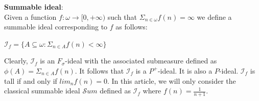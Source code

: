 \documentclass[a4paper]{amsart}
\newcommand{\SUM}{\mathcal{S}um}
\begin{document}
\textbf{Summable ideal}:\\
        Given a function $f:\omega\rightarrow[0,+\infty)$ such that $\Sigma_{n\in\omega}f(n)=\infty$ we define a summable ideal corresponding to $f$ as follows:
        \begin{center}
            $\mathcal{I}_{f}=\{A\subseteq\omega:\Sigma_{n\in A}f(n)<\infty\}$
        \end{center}
        Clearly, $\mathcal{I}_{f}$ is an $F_{\sigma}$-ideal with the associated submeasure defined as $\phi(A)=\Sigma_{n\in A}f(n)$. It follows that $\mathcal{I}_{f}$ is a $P^{+}$-ideal. It is also a $P$-ideal. $\mathcal{I}_{f}$ is tall if and only if $lim_{n}f(n)=0$. In this article, we will only consider the classical summable ideal $\SUM$ defined as $\mathcal{I}_{f}$ where $f(n)=\frac{1}{n+1}$.\\
        
\end{document}
